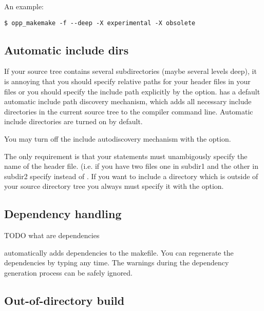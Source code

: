 An example:

\begin{verbatim}
$ opp_makemake -f --deep -X experimental -X obsolete
\end{verbatim}


\subsection{Automatic include dirs}

If your source tree contains several subdirectories (maybe several levels
deep), it is annoying that you should specify relative paths for your
header files in your  files or you should specify the include path
explicitly by the  option.  has a
default automatic include path discovery mechanism, which adds all necessary include
directories in the current source tree to the compiler command line.
Automatic include directories are turned on by default.

\begin{note}
You may turn off the include autodiscovery mechanism with the
 option.
\end{note}

The only requirement is that your  statements must unambigously
specify the name of the header file. (i.e. if you have two 
files one in subdir1 and the other in subdir2 specify  instead of . If you want to
include a directory which is outside of your source directory tree you
always must specify it with the  option.


\subsection{Dependency handling}

TODO what are dependencies

 automatically adds dependencies to the makefile.
You can regenerate the dependencies by typing  any time.
The warnings during the dependency generation process can
be safely ignored.


\subsection{Out-of-directory build}

